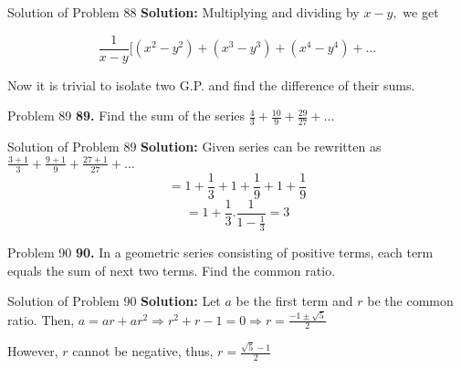 \documentclass[aspectratio=1610,8pt]{beamer}
\begin{document}
\begin{frame}{Solution of Problem 88}
  \textbf{Solution:} Multiplying and dividing by $x - y,$ we get

  $$\frac{1}{x - y}[(x^2 - y^2) + (x^3 - y^3) + (x^4 - y^4) + \ldots$$

  Now it is trivial to isolate two G.P. and find the difference of their sums.
\end{frame}
\begin{frame}{Problem 89}
  \textbf{89.} Find the sum of the series $\frac{4}{3} + \frac{10}{9} + \frac{29}{27} + \ldots$
\end{frame}
\begin{frame}{Solution of Problem 89}
  \textbf{Solution:} Given series can be rewritten as $\frac{3 + 1}{3} + \frac{9 + 1}{9} + \frac{27 + 1}{27} + \ldots$
  $$= 1 + \frac{1}{3} + 1 + \frac{1}{9} + 1 + \frac{1}{9}$$
  $$= 1 + \frac{1}{3}.\frac{1}{1 - \frac{1}{3}} = 3$$
\end{frame}
\begin{frame}{Problem 90}
  \textbf{90.} In a geometric series consisting of positive terms, each term equals the sum of next two terms. Find the common ratio.
\end{frame}
\begin{frame}{Solution of Problem 90}
  \textbf{Solution:} Let $a$ be the first term and $r$ be the common ratio.
  Then, $a = ar + ar^2 \Rightarrow r^2 + r - 1 = 0 \Rightarrow r = \frac{-1\pm\sqrt{5}}{2}$

  However, $r$ cannot be negative, thus, $r = \frac{\sqrt{5} - 1}{2}$
\end{frame}
\end{document}
